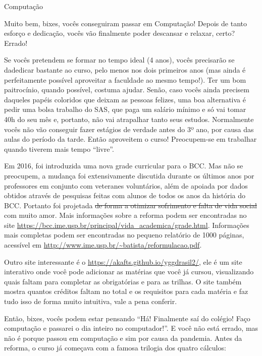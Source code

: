 \begin{subsecao}{Computação}

Muito bem, bixes, vocês conseguiram passar em Computação! Depois de tanto
esforço e dedicação, vocês vão finalmente poder descansar e relaxar, certo?
Errado!

Se vocês pretendem se formar no tempo ideal (4 anos), vocês precisarão se
dadedicar bastante ao curso, pelo menos nos dois primeiros anos (mas ainda é
perfeitamente possível aproveitar a faculdade ao mesmo tempo!). Ter um bom
paitrocínio, quando possível, costuma ajudar. Senão, caso vocês ainda precisem
daqueles papéis coloridos que deixam as pessoas felizes, uma boa alternativa é
pedir uma bolsa trabalho do SAS, que paga um salário mínimo e só vai tomar
40h do seu mês e, portanto, não vai atrapalhar tanto seus estudos. Normalmente
vocês não vão conseguir fazer estágios de verdade antes do 3º ano, por causa
das aulas do período da tarde. Então aproveitem o curso! Preocupem-se em
trabalhar quando tiverem mais tempo ``livre''.

Em 2016, foi introduzida uma nova grade curricular para o
BCC. Mas não se preocupem, a
mudança foi extensivamente discutida durante os últimos anos por professores em
conjunto com veteranes voluntários, além de apoiada por dados obtidos através de
pesquisas feitas com alunos de todos os anos da história do BCC. Portanto foi
projetada \sout{de forma a otimizar sofrimento e falta de vida social} com muito
amor. Mais informações sobre a reforma podem ser encontradas no site
\url{https://bcc.ime.usp.br/principal/vida_academica/grade.html}. Informações mais
completas podem ser encontradas no pequeno relatório de 1000 páginas, acessível em
\url{http://www.ime.usp.br/~batista/reformulacao.pdf}.

Outro site interessante é o \url{https://akafts.github.io/yggdrasil2/}, ele é um
site interativo onde você pode adicionar as matérias que você já cursou, visualizando
quais faltam para completar as obrigatórias e para as trilhas. O site também mostra
quantos créditos faltam no total e os requisitos para cada matéria e faz tudo isso
de forma muito intuitiva, vale a pena conferir.

Então, bixes, vocês podem estar pensando ``Há! Finalmente saí do colégio! Faço
computação e passarei o dia inteiro no computador!''. E você não está errado, mas não é porque passou em computação e sim por causa da pandemia. Antes
da reforma, o curso já começava com a famosa trilogia dos quatro cálculos:


\end{subsecao}
